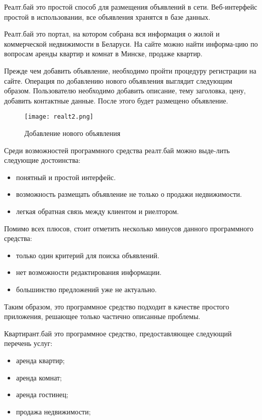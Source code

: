 Реалт.бай это простой способ для размещения объявлений в сети. Веб-интерфейс простой в использовании, все объявления хранятся в базе данных.

Реалт.бай это портал, на котором собрана вся информация о жилой и коммерческой недвижимости в Беларуси. На сайте можно найти информа-цию по вопросам аренды квартир и комнат в Минске, продаже квартир.

Прежде чем добавить объявление, необходимо пройти процедуру регистрации на сайте. Операция по добавлению нового объявления выглядит следующим образом. Пользователю необходимо добавить описание, тему заголовка, цену,  добавить контактные данные. После этого будет размещено объявление.

\begin{figure}[!htb]
	\centering
	\texttt{[image: realt2.png]}
	\caption{ Добавление нового объявления }
	\label{fig:arch_and_mod::realt2}
	\clearpage
\end{figure}

Среди возможностей программного средства реалт.бай  можно выде-лить следующие достоинства:

\begin{itemize}
	\item понятный и простой интерфейс.
	\item возможность размещать объявление не только о продажи недвижимости.
	\item легкая обратная связь между клиентом и риелтором.
\end{itemize}

Помимо всех плюсов, стоит отметить несколько минусов данного программного средства:

\begin{itemize}
	\item только один критерий для поиска объявлений.
	\item нет возможности редактирования информации.
	\item большинство предложений уже не актуально.
\end{itemize}

Таким образом, это программное средство подходит в качестве простого приложения, решающее только частично описанные проблемы.

Квартирант.бай это программное средство, предоставляющее следующий перечень услуг:

\begin{itemize}
	\item аренда квартир;
	\item аренда комнат;
	\item аренда гостинец;
	\item продажа недвижимости;
\end{itemize}

